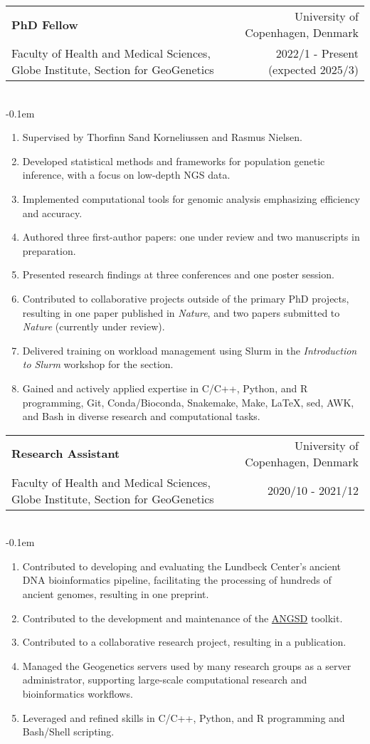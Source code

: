 \documentclass[letterpaper,10.5pt]{article}
\makeatletter
\newcommand{\cvSubheading}[5]{
  \vspace{-1pt}\item
    \begin{tabular*}{0.97\textwidth}{l@{\extracolsep{\fill}}r}
      \textbf{#1} & #2 \\
      {\small#3} & {\small #4} \\
    \end{tabular*}\vspace{3pt} \\
    #5
}
\makeatother
\begin{document}
        \cvSubheading
        {PhD Fellow}
        {University of Copenhagen, Denmark}
        {Faculty of Health and Medical Sciences, Globe Institute, Section for GeoGenetics}
        {2022/1 - Present (expected 2025/3)}
            \vspace{-0.1em} \begin{enumerate}[label=\textbf{-},nosep,wide,  labelindent=0pt]
        \item Supervised by Thorfinn Sand Korneliussen and Rasmus Nielsen.
        \item Developed statistical methods and frameworks for population genetic inference, with a focus on low-depth NGS data.
        \item Implemented computational tools for genomic analysis emphasizing efficiency and accuracy.
        \item Authored three first-author papers: one under review and two manuscripts in preparation.
        \item Presented research findings at three conferences and one poster session.
        \item Contributed to collaborative projects outside of the primary PhD projects, resulting in one paper published in \textit{Nature}, and two papers submitted to \textit{Nature} (currently under review).
        \item Delivered training on workload management using Slurm in the \textit{Introduction to Slurm} workshop for the section.
        \item Gained and actively applied expertise in C/C++, Python, and R programming, Git, Conda/Bioconda, Snakemake, Make, \LaTeX, sed, AWK, and Bash in diverse research and computational tasks.
      \end{enumerate}
    \medskip
  
        \cvSubheading
        {Research Assistant}
        {University of Copenhagen, Denmark}
        {Faculty of Health and Medical Sciences, Globe Institute, Section for GeoGenetics}
        {2020/10 - 2021/12}
          \vspace{-0.1em} \begin{enumerate}[label=\textbf{-},nosep,wide,  labelindent=0pt]
        \item Contributed to developing and evaluating the Lundbeck Center's ancient DNA bioinformatics pipeline, facilitating the processing of hundreds of ancient genomes, resulting in one preprint.
        \item Contributed to the development and maintenance of the \href{https://github.com/ANGSD/angsd/}{ANGSD} toolkit.
        \item Contributed to a collaborative research project, resulting in a publication.
        \item Managed the Geogenetics servers used by many research groups as a server administrator, supporting large-scale computational research and bioinformatics workflows.
        \item Leveraged and refined skills in C/C++, Python, and R programming and Bash/Shell scripting.
    \end{enumerate}
\end{document}
